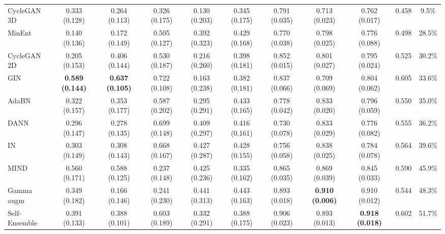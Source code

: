 \begin{table}
{\begin{tabular}{lcccccccccc}
			CycleGAN 3D \cite{cyclegan3d} & 0.333 (0.128) & 0.264 (0.113) & 0.326 (0.175) & 0.130 (0.203) & 0.345 (0.175) & 0.791 (0.035) & 0.713 (0.023) & 0.762 (0.017) & 0.458 & 9.5\% \\ %
			
			MinEnt \cite{entropy} & 0.140 (0.136) & 0.172 (0.149) & 0.505 (0.127) & 0.392 (0.323) & 0.429 (0.168) & 0.770 (0.038) & 0.798 (0.025) & 0.776 (0.088) & 0.498 & 28.5\% \\
			
			CycleGAN 2D \cite{cyclegan} & 0.205 (0.153) & 0.406 (0.144) & 0.530 (0.187) & 0.216 (0.260) & 0.398 (0.181) & 0.852 (0.015) & 0.801 (0.027) & 0.795 (0.024) & 0.525 & 30.2\% \\ %
			
			GIN \cite{gin} & \textbf{0.589 (0.144)} & \textbf{0.637 (0.105)} & 0.722 (0.108) & 0.163 (0.238) & 0.382 (0.181) & 0.837 (0.066) & 0.709 (0.069) & 0.804 (0.062) & 0.605 & 33.6\% \\
			
			AdaBN \cite{adabn} & 0.322 (0.157) & 0.353 (0.177) & 0.587 (0.202) & 0.295 (0.291) & 0.433 (0.165) & 0.778 (0.042) & 0.833 (0.020) & 0.796 (0.059) & 0.550 & 35.0\% \\
			
			DANN \cite{dann_medim} & 0.296 (0.147) & 0.278 (0.135) & 0.699 (0.148) & 0.409 (0.297) & 0.416 (0.161) & 0.730 (0.078) & 0.833 (0.029) & 0.776 (0.082) & 0.555 & 36.2\% \\
			
			IN \cite{instance_norm} & 0.303 (0.149) & 0.308 (0.143) & 0.668 (0.167) & 0.427 (0.287) & 0.428 (0.155) & 0.756 (0.058) & 0.838 (0.025) & 0.784 (0.078) & 0.564 & 39.6\% \\ %
			
			MIND \cite{dg_tta} & 0.560 (0.171) & 0.588 (0.125) & 0.237 (0.148) & 0.425 (0.236) & 0.335 (0.162) & 0.865 (0.035) & 0.869 (0.039) & 0.845 (0.033) & 0.590 & 45.9\% \\
			
			Gamma augm     & 0.349 (0.182) & 0.166 (0.146) & 0.241 (0.230) & 0.441 (0.313) & 0.443 (0.163) & 0.893 (0.018) & \textbf{0.910 (0.006)} & 0.910 (0.012) & 0.544 & 48.3\% \\
			
			Self-Ensemble \cite{se_medim} & 0.391 (0.133) & 0.388 (0.101) & 0.603 (0.189) & 0.332 (0.291) & 0.388 (0.175) & 0.906 (0.023) & 0.893 (0.013) & \textbf{0.918 (0.018)} & 0.602 & 51.7\% \\
			

\end{tabular}}
\end{table}
